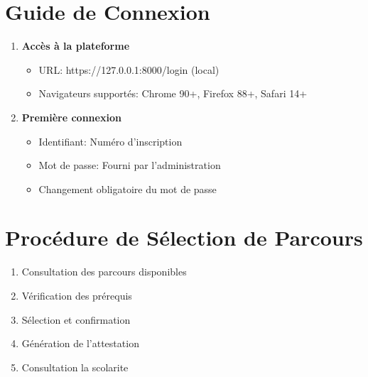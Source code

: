 \documentclass[12pt,a4paper]{report}
\begin{document}
\section{Guide de Connexion}
\begin{enumerate}
    \item \textbf{Accès à la plateforme}
    \begin{itemize}
        \item URL: https://127.0.0.1:8000/login (local)
        \item Navigateurs supportés: Chrome 90+, Firefox 88+, Safari 14+
    \end{itemize}
    \item \textbf{Première connexion}
    \begin{itemize}
        \item Identifiant: Numéro d'inscription
        \item Mot de passe: Fourni par l'administration
        \item Changement obligatoire du mot de passe
    \end{itemize}
\end{enumerate}

\section{Procédure de Sélection de Parcours}
\begin{enumerate}
    \item Consultation des parcours disponibles
    \item Vérification des prérequis
    \item Sélection et confirmation
    \item Génération de l'attestation
    \item Consultation la scolarite
\end{enumerate}
\end{document}
